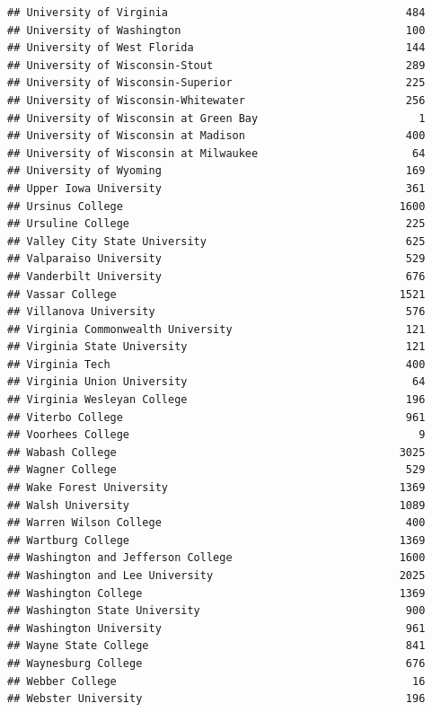 \documentclass[
]{article}
\begin{document}
\begin{verbatim}
## University of Virginia                                     484
## University of Washington                                   100
## University of West Florida                                 144
## University of Wisconsin-Stout                              289
## University of Wisconsin-Superior                           225
## University of Wisconsin-Whitewater                         256
## University of Wisconsin at Green Bay                         1
## University of Wisconsin at Madison                         400
## University of Wisconsin at Milwaukee                        64
## University of Wyoming                                      169
## Upper Iowa University                                      361
## Ursinus College                                           1600
## Ursuline College                                           225
## Valley City State University                               625
## Valparaiso University                                      529
## Vanderbilt University                                      676
## Vassar College                                            1521
## Villanova University                                       576
## Virginia Commonwealth University                           121
## Virginia State University                                  121
## Virginia Tech                                              400
## Virginia Union University                                   64
## Virginia Wesleyan College                                  196
## Viterbo College                                            961
## Voorhees College                                             9
## Wabash College                                            3025
## Wagner College                                             529
## Wake Forest University                                    1369
## Walsh University                                          1089
## Warren Wilson College                                      400
## Wartburg College                                          1369
## Washington and Jefferson College                          1600
## Washington and Lee University                             2025
## Washington College                                        1369
## Washington State University                                900
## Washington University                                      961
## Wayne State College                                        841
## Waynesburg College                                         676
## Webber College                                              16
## Webster University                                         196

\end{verbatim}
\end{document}
